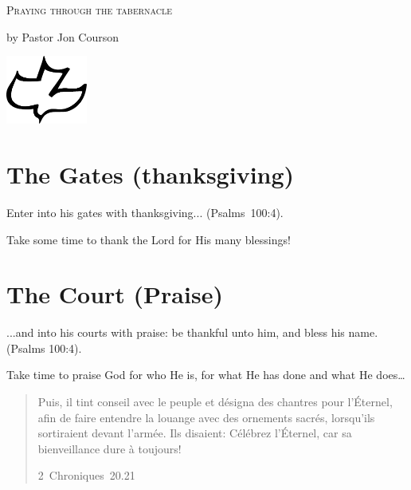 \begin{center}
\mbox{}

\bigskip

\LARGE\textsc{Praying through the tabernacle}

\vspace{2ex plus \fill}

\large{by Pastor Jon Courson}

\vspace{3ex plus \fill}

\includegraphics[width=0.2\textwidth]{colombe.pdf}

\vspace{0ex plus \fill}


\mbox{}
\end{center}

\pagestyle{empty}
\setlength{\parindent}{0em}

\section{The Gates (thanksgiving)}

Enter into his gates with thanksgiving... (Psalms~100:4).

Take some time to thank the Lord for His many blessings!


\section{The Court (Praise)}

...and into his courts with praise: be thankful unto him, and bless his name. (Psalms 100:4).

Take time to praise God for who He is, for what He has done and what He does\dots{} 



\begin{quote}
\og Puis, il tint conseil avec le peuple et désigna des chantres pour l’Éternel, afin de faire entendre la louange avec des ornements sacrés, lorsqu’ils sortiraient devant l’armée. Ils disaient: Célébrez l’Éternel, car sa bienveillance dure à toujours! \fg{}

\raggedleft\small 2~Chroniques~20.21
\end{quote}


